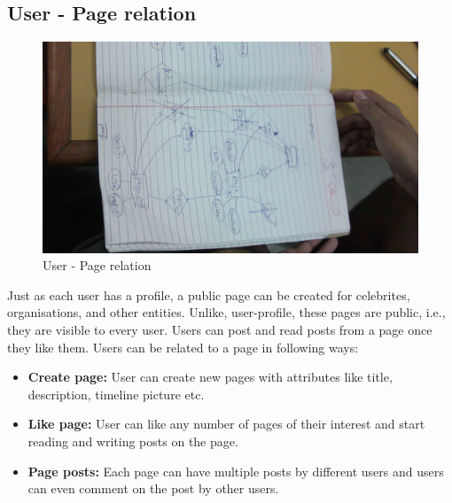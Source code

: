 \documentclass{article}
\begin{document}
\subsection{User - Page relation}
\begin{figure}[h]
\centering
\includegraphics[scale=0.2]{fig2.jpg}
\caption{User - Page relation}
\label{fig2}
\end{figure}
Just as each user has a profile, a public page can be created for celebrites, organisations, and other entities. Unlike, user-profile, these pages are public, i.e., they are visible to every user. Users can post and read posts from a page once they like them. Users can be related to a page in following ways:
\begin{itemize}
\item \textbf{Create page:} User can create new pages with attributes like title, description, timeline picture etc.
\item \textbf{Like page:} User can like any number of pages of their interest and start reading and writing posts on the page.
\item \textbf{Page posts:} Each page can have multiple posts by different users and users can even comment on the post by other users.
\end{itemize}
\end{document}
